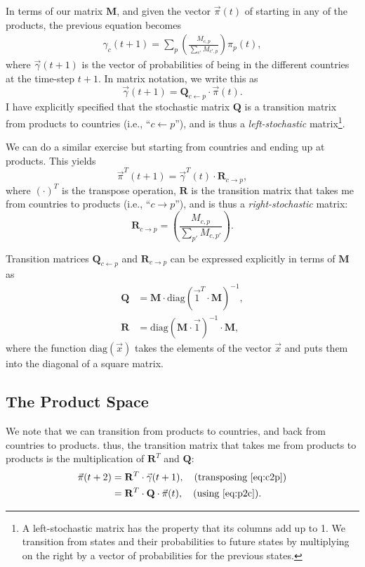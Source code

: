 \documentclass[12pt]{article}
\newcommand{\mtx}[1]{\mathbf{ #1}}
\begin{document}
In terms of our matrix $\mtx{M}$, and given the vector $\vec{\pi}(t)$ of starting in any of the products, the previous equation becomes
\begin{align}
	\gamma_c(t+1) = \sum_{p}\left(\frac{M_{c,p}}{\sum_{c'} M_{c',p}}\right)\pi_p(t),
\end{align}
where $\vec{\gamma}(t+1)$ is the vector of probabilities of being in the different countries at the time-step $t+1$. In matrix notation, we write this as
\begin{equation}
	\vec{\gamma}(t+1) = \mtx{Q}_{c\leftarrow p}\cdot\vec{\pi}(t).
\label{eq:p2c}
\end{equation}
I have explicitly specified that the stochastic matrix $\mtx{Q}$ is a transition matrix from products to countries (i.e., ``$c\leftarrow p$''), and is thus a \emph{left-stochastic} matrix\footnote{A left-stochastic matrix has the property that its columns add up to 1. We transition from states and their probabilities to future states by multiplying on the right by a vector of probabilities for the previous states.}. 

We can do a similar exercise but starting from countries and ending up at products. This yields
\begin{equation}
	\vec{\pi}^T(t+1) = \vec{\gamma}^T(t)\cdot\mtx{R}_{c\rightarrow p},
\label{eq:c2p}
\end{equation}
where $(\cdot)^T$ is the transpose operation, $\mtx{R}$ is the transition matrix that takes me from countries to products (i.e., ``$c\rightarrow p$''), and is thus a \emph{right-stochastic} matrix:
$$
\mtx{R}_{c\rightarrow p}=\left(\frac{M_{c,p}}{\sum_{p'} M_{c,p'}}\right).
$$

Transition matrices $\mtx{Q}_{c\leftarrow p}$ and $\mtx{R}_{c\rightarrow p}$ can be expressed explicitly in terms of $\mtx{M}$ as
\begin{align}
	\mtx{Q} &= \mtx{M}\cdot \text{diag}(\vec{1}^T\cdot\mtx{M})^{-1},\\
	\mtx{R} &= \text{diag}(\mtx{M}\cdot\vec{1})^{-1}\cdot\mtx{M},	
\end{align}
where the function $\text{diag}(\vec{x})$ takes the elements of the vector $\vec{x}$ and puts them into the diagonal of a square matrix.

\subsection{The Product Space}
We note that we can transition from products to countries, and back from countries to products. thus, the transition matrix that takes me from products to products is the multiplication of $\mtx{R}^T$ and $\mtx{Q}$:
\begin{align}
	\vec{\pi}(t+2) &= \mtx{R}^T\cdot\vec{\gamma}(t+1),\quad\text{(transposing \cref{eq:c2p})}\\
	&= \mtx{R}^T\cdot\mtx{Q}\cdot\vec{\pi}(t),\quad\text{(using \cref{eq:p2c})}.
\label{eq:p2p}
\end{align}
\end{document}
